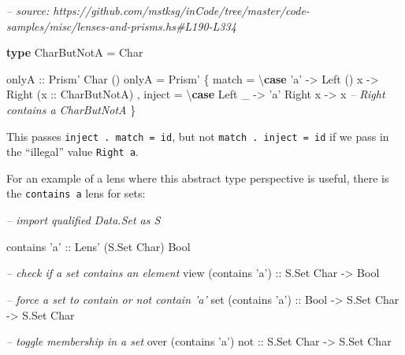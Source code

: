 \documentclass[]{article}
\newenvironment{Shaded}{}{}
\newcommand{\CharTok}[1]{\textcolor[rgb]{0.25,0.44,0.63}{#1}}
\newcommand{\CommentTok}[1]{\textcolor[rgb]{0.38,0.63,0.69}{\textit{#1}}}
\newcommand{\DataTypeTok}[1]{\textcolor[rgb]{0.56,0.13,0.00}{#1}}
\newcommand{\FunctionTok}[1]{\textcolor[rgb]{0.02,0.16,0.49}{#1}}
\newcommand{\KeywordTok}[1]{\textcolor[rgb]{0.00,0.44,0.13}{\textbf{#1}}}
\newcommand{\NormalTok}[1]{#1}
\newcommand{\OtherTok}[1]{\textcolor[rgb]{0.00,0.44,0.13}{#1}}
\begin{document}
\begin{Shaded}
\begin{Highlighting}[]
\CommentTok{-- source: https://github.com/mstksg/inCode/tree/master/code-samples/misc/lenses-and-prisms.hs#L190-L334}

\KeywordTok{type} \DataTypeTok{CharButNotA} \FunctionTok{=} \DataTypeTok{Char}

\OtherTok{onlyA ::} \DataTypeTok{Prism'} \DataTypeTok{Char}\NormalTok{ ()}
\NormalTok{onlyA }\FunctionTok{=} \DataTypeTok{Prism'}
\NormalTok{    \{ match  }\FunctionTok{=}\NormalTok{ \textbackslash{}}\KeywordTok{case}
        \CharTok{'a'} \OtherTok{->} \DataTypeTok{Left}\NormalTok{ ()}
\NormalTok{        x   }\OtherTok{->} \DataTypeTok{Right}\NormalTok{ (}\OtherTok{x ::} \DataTypeTok{CharButNotA}\NormalTok{)}
\NormalTok{    , inject }\FunctionTok{=}\NormalTok{ \textbackslash{}}\KeywordTok{case}
        \DataTypeTok{Left}\NormalTok{  _ }\OtherTok{->} \CharTok{'a'}
        \DataTypeTok{Right}\NormalTok{ x }\OtherTok{->}\NormalTok{ x        }\CommentTok{-- Right contains a CharButNotA}
\NormalTok{    \}}
\end{Highlighting}
\end{Shaded}

This passes \texttt{inject\ .\ match\ =\ id}, but not
\texttt{match\ .\ inject\ =\ id} if we pass in the ``illegal'' value
\texttt{Right\ \textquotesingle{}a\textquotesingle{}}.

For an example of a lens where this abstract type perspective is useful, there
is the \texttt{contains\ \textquotesingle{}a\textquotesingle{}} lens for sets:

\begin{Shaded}
\begin{Highlighting}[]
\CommentTok{-- import qualified Data.Set as S}

\NormalTok{contains }\CharTok{'a'}\OtherTok{ ::} \DataTypeTok{Lens'}\NormalTok{ (}\DataTypeTok{S.Set} \DataTypeTok{Char}\NormalTok{) }\DataTypeTok{Bool}

\CommentTok{-- check if a set contains an element}
\NormalTok{view (contains }\CharTok{'a'}\NormalTok{)}\OtherTok{ ::} \DataTypeTok{S.Set} \DataTypeTok{Char} \OtherTok{->} \DataTypeTok{Bool}

\CommentTok{-- force a set to contain or not contain 'a'}
\NormalTok{set (contains }\CharTok{'a'}\NormalTok{)}\OtherTok{ ::} \DataTypeTok{Bool} \OtherTok{->} \DataTypeTok{S.Set} \DataTypeTok{Char} \OtherTok{->} \DataTypeTok{S.Set} \DataTypeTok{Char}

\CommentTok{-- toggle membership in a set}
\NormalTok{over (contains }\CharTok{'a'}\NormalTok{)}\OtherTok{ not ::} \DataTypeTok{S.Set} \DataTypeTok{Char} \OtherTok{->} \DataTypeTok{S.Set} \DataTypeTok{Char}
\end{Highlighting}
\end{Shaded}
\end{document}
